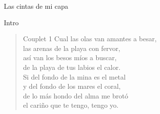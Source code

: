 \begin{song}{Las cintas de mi capa}

\begin{instrumental}{Intro}
  \measure{}  \measure{} \measure{} 
  \measure{}  \measure{}  \measure{} 
\end{instrumental}

\begin{verse}{Couplet 1}
Cual las olas van amantes a besar,\\
las arenas de la playa con fervor,\\
así van los besos míos a buscar,\\
de la playa de tus labios el calor.\\
Si del fondo de la mina es el metal\\
y del fondo de los mares el coral,\\
de lo más hondo del alma me brotó\\
el cariño que te tengo, tengo yo.\hspace{2em}  \hspace{2em}\hspace{1em} 
\end{verse}


\end{song}
